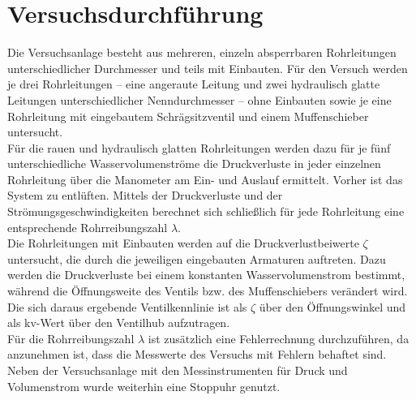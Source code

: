 \section{Versuchsdurchführung}
\label{sec:durchfuerung}

Die Versuchsanlage besteht aus mehreren, einzeln absperrbaren Rohrleitungen unterschiedlicher Durchmesser und teils mit Einbauten. Für den Versuch werden je drei Rohrleitungen – eine angeraute Leitung und zwei hydraulisch glatte Leitungen unterschiedlicher Nenndurchmesser – ohne Einbauten sowie je eine Rohrleitung mit eingebautem Schrägsitzventil und einem Muffenschieber untersucht. \\
Für die rauen und hydraulisch glatten Rohrleitungen werden dazu für je fünf unterschiedliche Wasservolumenströme die Druckverluste in jeder einzelnen Rohrleitung über die Manometer am Ein- und Auslauf ermittelt. \linebreak 
Vorher ist das System zu entlüften. Mittels der Druckverluste und der Strömungsgeschwindigkeiten berechnet sich schließlich für jede Rohrleitung eine entsprechende Rohrreibungszahl $\lambda$. \\
Die Rohrleitungen mit Einbauten werden auf die Druckverlustbeiwerte $\zeta$ untersucht, die durch die jeweiligen eingebauten Armaturen auftreten. Dazu werden die Druckverluste bei einem konstanten Wasservolumenstrom bestimmt, während die Öffnungsweite des Ventils bzw. des Muffenschiebers verändert wird. Die sich daraus ergebende Ventilkennlinie ist als $\zeta$ über den Öffnungswinkel und als kv-Wert über den Ventilhub aufzutragen. \\
Für die Rohrreibungszahl $\lambda$ ist zusätzlich eine Fehlerrechnung durchzuführen, da anzunehmen ist, dass die Messwerte des Versuchs mit Fehlern behaftet sind.\\
Neben der Versuchsanlage mit den Messinstrumenten für Druck und Volumenstrom wurde weiterhin eine Stoppuhr genutzt.